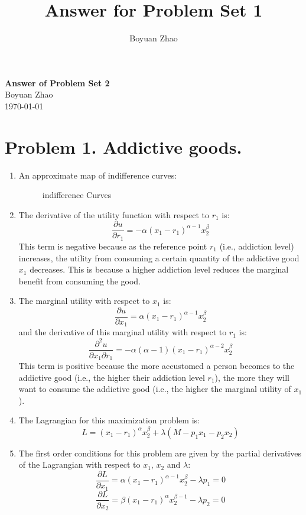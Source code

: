 \documentclass[UTF8,titlepage]{article}
\title{Answer for Problem Set 1}
\author{Boyuan Zhao}
\numberwithin{figure}{section}
\begin{document}
\begin{center}
    {\LARGE \textbf{Answer of Problem Set 2}}\\  %
    {\normalsize Boyuan Zhao}\\  %
    {\small \today}  %
\end{center}
\section{Problem 1. Addictive goods.}
\begin{enumerate}
    \item An approximate map of indifference curves:
    \begin{figure}[H]
    \centering
     \caption{indifference Curves}
     \label{}
    \end{figure}
    \item The derivative of the utility function with respect to $r_1$ is:
    \[\frac{\partial u}{\partial r_1} = -\alpha(x_1 - r_1)^{\alpha-1} x_2^\beta\]
    This term is negative because as the reference point $r_1$ (i.e., addiction level) increases, the utility from consuming a certain quantity of the addictive good $x_1$ decreases. This is because a higher addiction level reduces the marginal benefit from consuming the good.
    \item The marginal utility with respect to $x_1$ is:
    \[\frac{\partial u}{\partial x_1} = \alpha(x_1 - r_1)^{\alpha-1} x_2^\beta\]
    and the derivative of this marginal utility with respect to $r_1$ is:
    \[\frac{\partial^2 u}{\partial x_1 \partial r_1} = -\alpha(\alpha - 1)(x_1 - r_1)^{\alpha-2} x_2^\beta\]
    This term is positive because the more accustomed a person becomes to the addictive good (i.e., the higher their addiction level $r_1$), the more they will want to consume the addictive good (i.e., the higher the marginal utility of $x_1$).
    \item The Lagrangian for this maximization problem is:
    \[L = (x_1 - r_1)^\alpha x_2^\beta + \lambda(M - p_1x_1 - p_2x_2)\]
    \item The first order conditions for this problem are given by the partial derivatives of the Lagrangian with respect to $x_1$, $x_2$ and $\lambda$:
    \[\frac{\partial L}{\partial x_1} = \alpha(x_1 - r_1)^{\alpha-1} x_2^\beta - \lambda p_1 = 0\]
    \[\frac{\partial L}{\partial x_2} = \beta (x_1 - r_1)^\alpha x_2^{\beta-1} - \lambda p_2 = 0\]

\end{enumerate}
\end{document}
